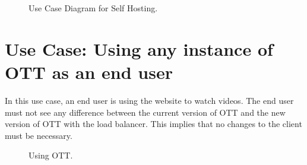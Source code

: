 \begin{figure}[!htb]
  \centering
  \caption{\label{Figure::gossip-class-diaguse-case-self-host} Use Case Diagram for Self Hosting.}
\end{figure}


\section{Use Case: Using any instance of OTT as an end user}

In this use case, an end user is using the website to watch videos. The end user must not see any difference between the current version of OTT and the new version of OTT with the load balancer. This implies that no changes to the client must be necessary.

\begin{figure}[!htb]
  \centering
  \caption{\label{Figure::enduser-usecase} Using OTT.}
\end{figure}